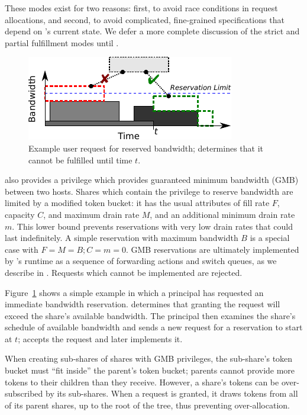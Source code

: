 These modes exist for two reasons: first, to avoid race conditions in
request allocations, and second, to avoid complicated, fine-grained
specifications that depend on \sys's current state. We defer a more
complete discussion of the strict and partial fulfillment modes until
.

\begin{figure}[t]
\centering
\includegraphics{figs/sched}
\caption{Example user request for reserved bandwidth;
\sys determines that it cannot be fulfilled until time $t$.}
\label{fig:sched}
\end{figure}


\sys also provides a  privilege which provides
guaranteed minimum bandwidth (GMB) between two hosts.
Shares which contain the privilege to reserve bandwidth are limited
by a modified token bucket:
it has the usual attributes of fill rate $F$, capacity $C$, and maximum
drain rate $M$, and an additional minimum drain rate $m$. This lower
bound prevents reservations with very low drain rates that could
last indefinitely. A simple reservation with maximum
bandwidth $B$ is a special case with $F = M = B; C = m = 0$. GMB
reservations are ultimately implemented by \sys's runtime as a
sequence of forwarding actions and switch queues, as we describe in
. Requests which cannot be implemented are
rejected.

Figure~\ref{fig:sched} shows a simple example in which a principal
has requested an immediate bandwidth reservation. \sys determines
that granting the request will exceed the share's available bandwidth.
The principal then examines the share's schedule of available bandwidth
and sends a new request for a reservation
to start at $t$; \sys accepts the request and later implements it.

When creating sub-shares of shares with GMB privileges, the sub-share's
token bucket must ``fit inside'' the parent's token bucket; parents cannot
provide more tokens to their children than they receive. However, a share's
tokens can be over-subscribed by its sub-shares. When a request is granted,
it draws tokens from all of its parent shares, up to the root of the tree, thus
preventing over-allocation.

